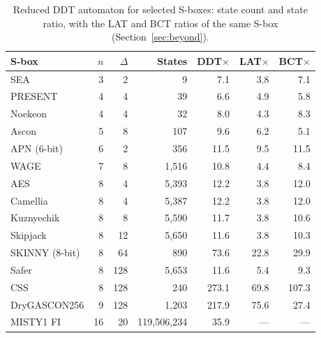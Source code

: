 \documentclass[runningheads]{llncs}
\begin{document}
\begin{table}[h]
\centering
\caption{Reduced DDT automaton for selected S-boxes: state count and state ratio,
with the LAT and BCT ratios of the same S-box (Section~\ref{sec:beyond}).}
\setlength{\tabcolsep}{3pt}
\label{tab:curated}
\small
\begin{tabular}{l r r r r r r}
\toprule
S-box & $n$ & $\Delta$ & States & DDT$\times$ & LAT$\times$ & BCT$\times$\\
\midrule
SEA            & 3 & 2   & 9    & 7.1  & 3.8  & 7.1\\
PRESENT        & 4 & 4   & 39   & 6.6 & 4.9  & 5.8\\
Noekeon        & 4 & 4   & 32   & 8.0  & 4.3  & 8.3\\
Ascon          & 5 & 8   & 107  & 9.6  & 6.2  & 5.1\\
APN (6-bit)    & 6 & 2   & 356  & 11.5 & 9.5  & 11.5\\
WAGE           & 7 & 8   & 1,516 & 10.8 & 4.4  & 8.4\\
AES            & 8 & 4   & 5,393 & 12.2 & 3.8  & 12.0\\
Camellia       & 8 & 4   & 5,387 & 12.2 & 3.8  & 12.0\\
Kuznyechik     & 8 & 8   & 5,590 & 11.7 & 3.8  & 10.6\\
Skipjack       & 8 & 12  & 5,650 & 11.6 & 3.8  & 10.3\\
SKINNY (8-bit) & 8 & 64  & 890   & 73.6 & 22.8 & 29.9\\
Safer          & 8 & 128 & 5,653 & 11.6 &  5.4 &  9.3\\
CSS            & 8 & 128 & 240  & 273.1& 69.8 & 107.3\\
DryGASCON256   & 9 & 128 & 1,203 & 217.9& 75.6 & 27.4\\
MISTY1 FI   & 16 & 20 & 119,506,234 & 35.9 & --- & ---\\
\bottomrule
\end{tabular}
\end{table}
\end{document}
